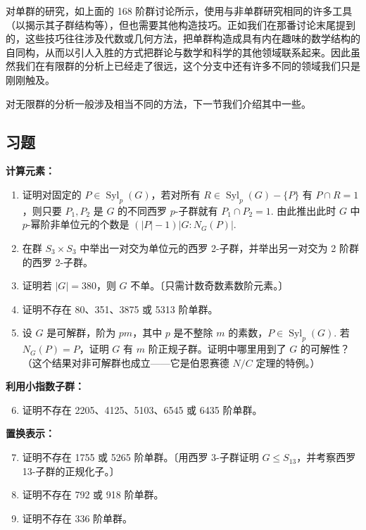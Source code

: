 对单群的研究，如上面的 168 阶群讨论所示，使用与非单群研究相同的许多工具（以揭示其子群结构等），但也需要其他构造技巧。正如我们在那番讨论末尾提到的，这些技巧往往涉及代数或几何方法，把单群构造成具有内在趣味的数学结构的自同构，从而以引人入胜的方式把群论与数学和科学的其他领域联系起来。因此虽然我们在有限群的分析上已经走了很远，这个分支中还有许多不同的领域我们只是刚刚触及。

对无限群的分析一般涉及相当不同的方法，下一节我们介绍其中一些。

\subsection*{习题}

\noindent\textbf{计算元素：}

\begin{enumerate}
\item 证明对固定的 \(P \in \operatorname{Syl}_p(G)\)，若对所有 \(R \in \operatorname{Syl}_p(G) - \{P\}\) 有 \(P \cap R = 1\)，则只要 \(P_1, P_2\) 是 \(G\) 的不同西罗 \(p\)-子群就有 \(P_1 \cap P_2 = 1\). 由此推出此时 \(G\) 中 \(p\)-幂阶非单位元的个数是 \((|P| - 1)|G : N_G(P)|\).

\item 在群 \(S_3 \times S_3\) 中举出一对交为单位元的西罗 2-子群，并举出另一对交为 2 阶群的西罗 2-子群。

\item 证明若 \(|G| = 380\)，则 \(G\) 不单。〔只需计数奇数素数阶元素。〕

\item 证明不存在 80、351、3875 或 5313 阶单群。

\item 设 \(G\) 是可解群，阶为 \(pm\)，其中 \(p\) 是不整除 \(m\) 的素数，\(P \in \operatorname{Syl}_p(G)\). 若 \(N_G(P) = P\)，证明 \(G\) 有 \(m\) 阶正规子群。证明中哪里用到了 \(G\) 的可解性？（这个结果对非可解群也成立——它是伯恩赛德 \(N/C\) 定理的特例。）
\end{enumerate}

\noindent\textbf{利用小指数子群：}

\begin{enumerate}\setcounter{enumi}{5}
\item 证明不存在 2205、4125、5103、6545 或 6435 阶单群。
\end{enumerate}

\noindent\textbf{置换表示：}

\begin{enumerate}\setcounter{enumi}{6}
\item 证明不存在 1755 或 5265 阶单群。〔用西罗 3-子群证明 \(G \leq S_{13}\)，并考察西罗 13-子群的正规化子。〕

\item 证明不存在 792 或 918 阶单群。

\item 证明不存在 336 阶单群。
\end{enumerate}

